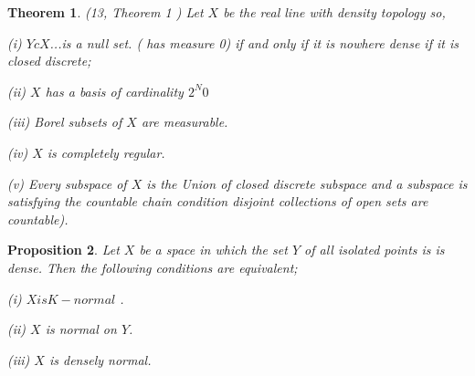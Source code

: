 \documentclass[PhD,14,a4paper]{report}
\theoremstyle{plain}
\newtheorem{thm}{Theorem}[section]
\newtheorem{prop}[thm]{Proposition}
\theoremstyle{definition}
\theoremstyle{remark}
\numberwithin{figure}{section}
\numberwithin{equation}{subsection}
\begin{document}
{\begin{thm}
(13, Theorem 1 ) Let $X$ be the real line with density topology so,

(i) $Y c X$...is a null set. ( has measure 0) if and only if it is nowhere dense if it is closed discrete;

(ii) $X$ has a basis of cardinality $2^N0$

(iii) Borel subsets of $X$ are measurable.

(iv) $X$ is completely regular.

(v) Every subspace of $X$ is the Union of closed discrete subspace and a subspace is satisfying the countable chain condition  disjoint collections of open sets are countable).
\end{thm}



\begin{prop}
  Let $X$ be a space in which the set $Y$ of all isolated points is is dense. Then the following conditions are equivalent;

(i) $X is K - normal$ .

(ii) $X$ is normal on $Y$.

(iii) $X$ is densely normal.
\end{prop}



}
\end{document}

